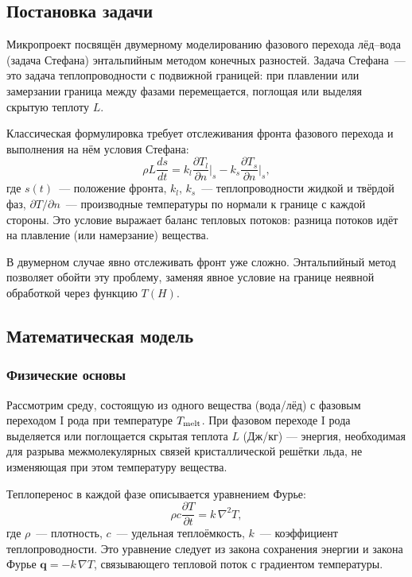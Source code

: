 \subsection{Постановка задачи}

Микропроект посвящён двумерному моделированию фазового перехода лёд--вода
(задача Стефана) энтальпийным методом конечных разностей.
Задача Стефана~--- это задача теплопроводности с подвижной границей:
при плавлении или замерзании граница между фазами перемещается,
поглощая или выделяя скрытую теплоту $L$.

Классическая формулировка требует отслеживания фронта фазового перехода
и выполнения на нём условия Стефана:
\begin{equation}\label{eq:stefan_condition}
  \rho L \frac{ds}{dt} = k_l \frac{\partial T_l}{\partial n}\bigg|_{s}
                       - k_s \frac{\partial T_s}{\partial n}\bigg|_{s},
\end{equation}
где $s(t)$~--- положение фронта, $k_l$, $k_s$~--- теплопроводности жидкой
и твёрдой фаз, $\partial T / \partial n$~--- производные температуры по
нормали к границе с каждой стороны. Это условие выражает баланс тепловых
потоков: разница потоков идёт на плавление (или намерзание) вещества.

В двумерном случае явно отслеживать фронт уже сложно.
Энтальпийный метод позволяет обойти эту проблему, заменяя явное условие
на границе неявной обработкой через функцию $T(H)$.

\subsection{Математическая модель}

\subsubsection{Физические основы}

Рассмотрим среду, состоящую из одного вещества (вода/лёд) с фазовым переходом
I рода при температуре $T_{\rm melt}$. При фазовом переходе I рода
выделяется или поглощается скрытая теплота $L$ (Дж/кг) --- энергия,
необходимая для разрыва межмолекулярных связей кристаллической решётки льда,
не изменяющая при этом температуру вещества.

Теплоперенос в каждой фазе описывается уравнением Фурье:
\begin{equation}\label{eq:fourier}
  \rho c \frac{\partial T}{\partial t} = k\,\nabla^2 T,
\end{equation}
где $\rho$~--- плотность, $c$~--- удельная теплоёмкость, $k$~--- коэффициент
теплопроводности. Это уравнение следует из закона сохранения энергии
и закона Фурье $\mathbf{q} = -k\,\nabla T$, связывающего тепловой поток
с градиентом температуры.

